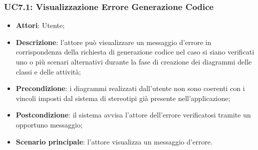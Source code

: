 \subsubsection{UC7.1: Visualizzazione Errore Generazione Codice}
\label{UC7.1}
\begin{itemize}
\item \textbf{Attori}: Utente;
\item \textbf{Descrizione}: l'attore può visualizzare un messaggio d'errore in corrispondenza della richiesta di generazione codice nel caso si siano verificati uno o più scenari alternativi durante la fase di creazione dei diagrammi delle classi e delle attività;	
\item \textbf{Precondizione}: i diagrammi realizzati dall'utente non sono coerenti con i vincoli imposti dal sistema di stereotipi già presente nell'applicazione;	
\item \textbf{Postcondizione}: il sistema avvisa l'attore dell'errore verificatosi tramite un opportuno messaggio;	
\item \textbf{Scenario principale}:
l'attore visualizza un messaggio d'errore.	
\end{itemize}


